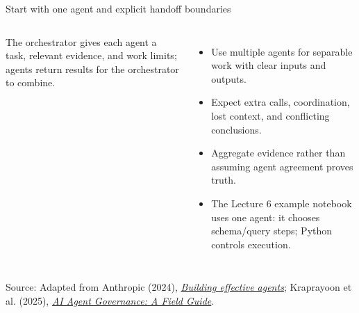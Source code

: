 \documentclass[aspectratio=169]{beamer}
\newcommand{\slidesource}[1]{\par\vfill\noindent\parbox{\linewidth}{\tiny\color{sourcegray}\raggedright\sloppy Source: #1.}}
\newcommand{\visualdescription}[1]{\par\vspace{.2em}\noindent\parbox{\linewidth}{\centering\tiny\color{sourcegray}#1}}
\begin{document}
\begin{frame}{Start with one agent and explicit handoff boundaries}
\small
\begin{columns}[c]
\centering
{}
\visualdescription{The orchestrator gives each agent a task, relevant evidence, and work limits; agents return results for the orchestrator to combine.}
\begin{itemize}\itemsep.5em
\item Use multiple agents for separable work with clear inputs and outputs.
\item Expect extra calls, coordination, lost context, and conflicting conclusions.
\item Aggregate evidence rather than assuming agent agreement proves truth.
\item The Lecture 6 example notebook uses one agent: it chooses schema/query steps; Python controls execution.
\end{itemize}
\end{columns}
\slidesource{Adapted from Anthropic (2024), \href{https://www.anthropic.com/research/building-effective-agents}{\emph{Building effective agents}}; Kraprayoon et al. (2025), \href{https://arxiv.org/abs/2505.21808}{\emph{AI Agent Governance: A Field Guide}}}
\end{frame}
\end{document}
